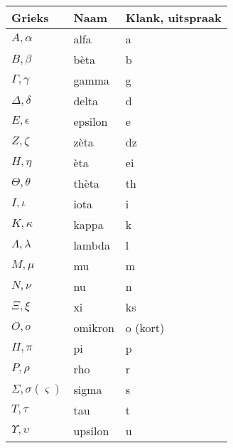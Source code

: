 \begin{table}
  \centering
  \begin{tabular}{lll}
  	\toprule
  	\textbf{Grieks}              & \textbf{Naam} & \textbf{Klank, uitspraak}   \\
  	\midrule
  	$A, \alpha$                  & alfa          & a                           \\
  	$B, \beta$                   & bèta          & b                           \\
  	$\Gamma, \gamma$             & gamma         & g                           \\
  	$\Delta, \delta$             & delta         & d                           \\
  	$E, \epsilon$                & epsilon       & e                           \\
  	$Z, \zeta$                   & zèta          & dz                          \\
  	$H, \eta$                    & èta           & ei                          \\
  	$\Theta, \theta$             & thèta         & th                          \\
  	$I, \iota$                   & iota          & i                           \\
  	$K, \kappa$                  & kappa         & k                           \\
  	$\Lambda, \lambda$           & lambda        & l                           \\
  	$M, \mu$                     & mu            & m                           \\
  	$N, \nu$                     & nu            & n                           \\
  	$\Xi, \xi$                   & xi            & ks                          \\
  	$O, o$                       & omikron       & o (kort)                    \\
  	$\Pi, \pi$                   & pi            & p                           \\
  	$P, \rho$                    & rho           & r                           \\
  	$\Sigma, \sigma (\varsigma)$ & sigma         & s                           \\
  	$T, \tau$                    & tau           & t                           \\
  	$\Upsilon, \upsilon$         & upsilon       & u                           \\

\end{tabular}
\end{table}
